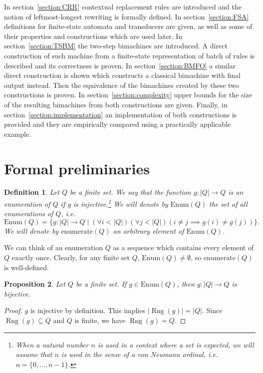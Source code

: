 \documentclass{article}
\newtheorem{definition}{Definition}[section]
\newtheorem{proposition}[definition]{Proposition}
\newcommand{\len}[1]{\ensuremath{\left| #1 \right|}}
\DeclareMathOperator{\Rng}{Rng}
\begin{document}
	In section~\ref{section:CRR} contextual replacement rules are introduced and the notion of leftmost-longest rewriting is formally defined.
	In section~\ref{section:FSA} definitions for finite-state automata and transducers are given, as well as some of their properties and constructions which are used later.
	In section~\ref{section:TSBM} the two-step bimachines are introduced. A direct construction of such machine from a finite-state representation of batch of rules is described and its correctness is proven.
	In section~\ref{section:BMFO} a similar direct construction is shown which constructs a classical bimachine with final output instead. Then the equivalence of the bimachines created by these two constructions is proven.
	In section~\ref{section:complexity} upper bounds for the size of the resulting bimachines from both constructions are given.
	Finally, in section~\ref{section:implementation} an implementation of both constructions is provided and they are empirically compared using a practically applicable example.
	
	\section{Formal preliminaries}
	\begin{definition} \label{def:enumeration}
		Let $Q$ be a finite set.
		We say that the function $g: \len{Q}\to Q$ is an enumeration of $Q$ if g is injective.\footnote{When a natural number $n$ is used in a context where a set is expected, we will assume that $n$ is used in the sense of a von Neumann ordinal, i.e.\ $n = \{ 0,\ldots,n-1 \}$.}
		We will denote by $\mathrm{Enum}(Q)$ the set of all enumerations of $Q$, i.e.
		\[ \mathrm{Enum}(Q) = \{ g: \len{Q}\to Q \mid (\forall i < \len{Q})(\forall j < \len{Q})(i\ne j \implies g(i)\ne g(j)) \}. \]
		We will denote by $\mathrm{enumerate}(Q)$ an arbitrary element of $\mathrm{Enum}(Q)$.
	\end{definition}
	We can think of an enumeration $Q$ as a sequence which contains every element of $Q$ exactly once.
	Clearly, for any finite set $Q$, $\mathrm{Enum}(Q)\ne\emptyset$, so $\mathrm{enumerate}(Q)$ is well-defined.
	
	\begin{proposition} \label{prop:enums_are_bijective}
		Let $Q$ be a finite set. If $g\in \mathrm{Enum}(Q)$, then $g: \len{Q}\to Q$ is bijective.
	\end{proposition}
	\begin{proof}
		$g$ is injective by definition. This implies $\len{\Rng(g)} = \len{Q}$.
		Since $\Rng(g)\subseteq Q$ and $Q$ is finite, we have $\Rng(g) = Q$.
	\end{proof}
\end{document}
